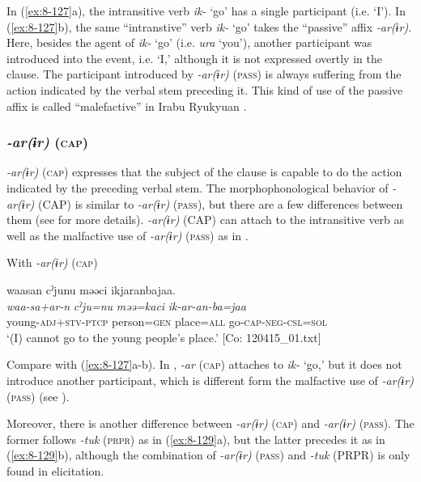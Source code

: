 In (\ref{ex:8-127}a), the intransitive verb \textit{ik-} ‘go’ has a single participant (i.e. ‘I’). In (\ref{ex:8-127}b), the same “intranstive” verb \textit{ik-} ‘go’ takes the “passive” affix \textit{-ar(ɨr)}. Here, besides the agent of \textit{ik-} ‘go’ (i.e. \textit{ura} ‘you’), another participant was introduced into the event, i.e. ‘I,’ although it is not expressed overtly in the clause. The participant introduced by \textit{-ar(ɨr)} (\textsc{pass}) is always suffering from the action indicated by the verbal stem preceding it. This kind of use of the passive affix is called “malefactive” in Irabu Ryukyuan \citep[493-498]{Shimoji2008}.

\subsubsection{\textit{-ar(ɨr)} (\textsc{cap})}
\label{bkm:Ref366851018}
\textit{-ar(ɨr)} (\textsc{cap}) expresses that the subject of the clause is capable to do the action indicated by the preceding verbal stem. The morphophonological behavior of \textit{-ar(ɨr)} (CAP) is similar to \textit{-ar(ɨr)} (\textsc{pass}), but there are a few differences between them (see  for more details). \textit{-ar(ɨr)} (CAP) can attach to the intransitive verb as well as the malfactive use of \textit{-ar(ɨr)} (\textsc{pass}) as in .

\ea\label{ex:8-128}
  With \textit{-ar(ɨr)} (\textsc{cap})

  {\TM}
\glll  waasan  cˀjunu  məəci  ikjaranbajaa.\\
\textit{waa-sa+ar-n}  \textit{cˀju=nu}  \textit{məə=kaci}  \textit{ik-ar-an-ba=jaa}\\
    young-\textsc{adj}+\textsc{stv}-\textsc{ptcp}  person=\textsc{gen}  place=\textsc{all}  go-\textsc{cap}-\textsc{neg}-\textsc{csl}=\textsc{sol}\\
\glt ‘(I) cannot go to the young people’s place.’ [Co: 120415\_01.txt]
\z

Compare  with (\ref{ex:8-127}a-b). In , \textit{-ar} (\textsc{cap}) attaches to \textit{ik-} ‘go,’ but it does not introduce another participant, which is different form the malfactive use of \textit{-ar(ɨr)} (\textsc{pass}) (see ).

  Moreover, there is another difference between \textit{-ar(ɨr)} (\textsc{cap}) and \textit{-ar(ɨr)} (\textsc{pass}). The former follows \textit{-tuk} (\textsc{prpr}) as in (\ref{ex:8-129}a), but the latter precedes it as in (\ref{ex:8-129}b), although the combination of \textit{-ar(ɨr)} (\textsc{pass}) and \textit{-tuk} (PRPR) is only found in elicitation.

